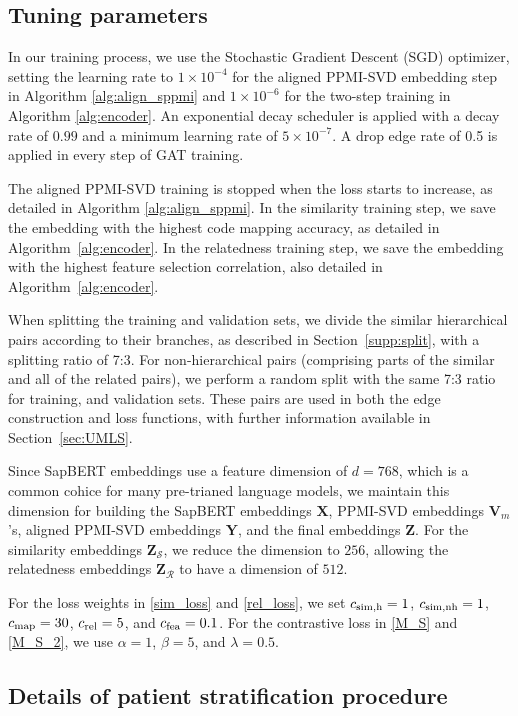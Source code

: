 \documentclass{article}
\def\V{\mathbf{V}}
\def\X{\mathbf{X}}
\def\Y{\mathbf{Y}}
\def\Z{\mathbf{Z}}
\begin{document}
\subsection{Tuning parameters}
\label{Tune}
In our training process, we use the Stochastic Gradient Descent (SGD) optimizer, setting the learning rate to \(1 \times 10^{-4}\) for the aligned PPMI-SVD embedding step in Algorithm \ref{alg:align_sppmi} and \(1 \times 10^{-6}\) for the two-step training in Algorithm \ref{alg:encoder}. An exponential decay scheduler is applied with a decay rate of \(0.99\) and a minimum learning rate of \(5 \times 10^{-7}\). A drop edge rate of 0.5 is applied in every step of GAT training. 

The aligned PPMI-SVD training is stopped when the loss starts to increase, as detailed in Algorithm \ref{alg:align_sppmi}. In the similarity training step, we save the embedding with the highest code mapping accuracy, as detailed in Algorithm~\ref{alg:encoder}. In the relatedness training step, we save the embedding with the highest feature selection correlation, also detailed in Algorithm~\ref{alg:encoder}. 

When splitting the training and validation sets, we divide the similar hierarchical pairs according to their branches, as described in Section~\ref{supp:split}, with a splitting ratio of 7:3. For non-hierarchical pairs (comprising parts of the similar and all of the related pairs), we perform a random split with the same 7:3 ratio for training, and validation sets. These pairs are used in both the edge construction and loss functions, with further information available in Section~\ref{sec:UMLS}.

Since SapBERT embeddings use a feature dimension of \(d = 768\), which is a common cohice for many pre-trianed language models, we maintain this dimension for building the SapBERT embeddings \(\X\), PPMI-SVD embeddings \(\V_{m}\)'s, aligned PPMI-SVD embeddings \(\Y\), and the final embeddings \(\Z\). For the similarity embeddings \(\Z_{\mathcal{S}}\), we reduce the dimension to $256$, allowing the relatedness embeddings \(\Z_{\mathcal{R}}\) to have a dimension of $512$.

For the loss weights in \eqref{sim_loss} and \eqref{rel_loss}, we set \(c_{\rm sim,h} = 1\),  \(c_{\rm sim,nh} = 1\), \(c_{\rm map} = 30\), \(c_{\rm rel} = 5\), and \(c_{\rm fea} = 0.1\). For the contrastive loss in \eqref{M_S} and \eqref{M_S_2}, we use \(\alpha = 1\), \(\beta = 5\), and \(\lambda = 0.5\).


\subsection{Details of patient stratification procedure}
\label{supp: patident embedding}
\end{document}
